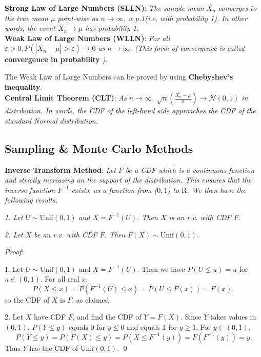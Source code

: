 \documentclass{progartcn}
\begin{document}
		\textbf{Strong Law of Large Numbers (SLLN)}: \textit{The sample mean $\bar{X_n}$ converges to the true mean $\mu$ point-wise as $n\to \infty$, w.p.1(i.e. with probability 1). In other words, the event $\bar{X_n}\to \mu$ has probability 1.}\\

		\textbf{Weak Law of Large Numbers (WLLN)}: \textit{For all $\varepsilon >0, P(|\bar{X_n}-\mu|>\varepsilon)\to 0$ as $n\to \infty$. (This form of convergence is called} \textbf{convergence in probability} \textit{).}

		The Weak Law of Large Numbers can be proved by using \textbf{Chebyshev's inequality}.\\

		\textbf{Central Limit Theorem (CLT)}: \textit{As $n\to \infty$, $\sqrt{n}\left( \frac{\bar{X_n}-\mu}{\sigma}\right )\to\mathcal{N}(0,1)$ in distribution. In words, the CDF of the left-hand side approaches the CDF of the standard Normal distribution.}\\

	\subsection{Sampling \& Monte Carlo Methods}

		\textbf{Inverse Transform Method}: \textit{Let $F$ be a CDF which is a continuous function and strictly increasing on the support of the distribution. This ensures that the inverse function $F^{-1}$ exists, as a function from ($0,1$) to $\mathrm{R}$. We then have the following results.}

		\qquad \textit{1. Let} $U\sim\text{Unif}(0,1)$ \textit{and $X=F^{-1}(U)$. Then $X$ is an r.v. with CDF $F$.}

		\qquad \textit{2. Let $X$ be an r.v. with CDF $F$. Then} $F(X)\sim\text{Unif}(0,1)$.

		\textit{Proof}:

		1. Let $U\sim\text{Unif}(0,1)$ and $X=F^{-1}(U)$. Then we have $P(U\le u)=u$ for $u\in(0,1)$. For all real $x$,
		\[P(X\le x)=P(F^{-1}(U)\le x)=P(U\le F(x))=F(x),\]
		so the CDF of $X$ is $F$, as claimed.

		2. Let $X$ have CDF $F$, and find the CDF of $Y=F(X)$. Since $Y$ takes values in $(0,1)$, $P(Y\le y)$ equals 0 for $y\le 0$ and equals 1 for $y\ge 1$. For $y\in (0,1)$,
		\[P(Y\le y) = P(F(X)\le y)=P(X\le F^{-1}(y))=F(F^{-1}(y))=y.\]
		Thus $Y$ has the CDF of $\text{Unif}(0,1)$.
		\qed\\
\end{document}
